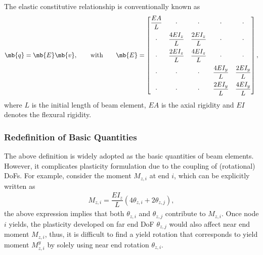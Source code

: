 The elastic constitutive relationship is conventionally known as
\begin{gather*}
\mb{q}=\mb{E}\mb{v},\qquad\text{with}\qquad\mb{E}=\begin{bmatrix}
\dfrac{EA}{L}&\cdot&\cdot&\cdot&\cdot\\[3mm]
\cdot&\dfrac{4EI_z}{L}&\dfrac{2EI_z}{L}&\cdot&\cdot\\[3mm]
\cdot&\dfrac{2EI_z}{L}&\dfrac{4EI_z}{L}&\cdot&\cdot\\[3mm]
\cdot&\cdot&\cdot&\dfrac{4EI_y}{L}&\dfrac{2EI_y}{L}\\[3mm]
\cdot&\cdot&\cdot&\dfrac{2EI_y}{L}&\dfrac{4EI_y}{L}
\end{bmatrix},
\end{gather*}
where $L$ is the initial length of beam element, $EA$ is the axial rigidity and $EI$ denotes the flexural rigidity.
\subsubsection{Redefinition of Basic Quantities}
The above definition is widely adopted as the basic quantities of beam elements. However, it complicates plasticity formulation due to the coupling of (rotational) DoFs. For example, consider the moment $M_{z,i}$ at end $i$, which can be explicitly written as
\begin{gather*}
M_{z,i}=\dfrac{EI_z}{L}\left(4\theta_{z,i}+2\theta_{z,j}\right),
\end{gather*}
the above expression implies that both $\theta_{z,i}$ and $\theta_{z,j}$ contribute to $M_{z,i}$. Once node $i$ yields, the plasticity developed on far end DoF $\theta_{z,j}$ would also affect near end moment $M_{z,i}$, thus, it is difficult to find a yield rotation that corresponds to yield moment $M^y_{z,i}$ by solely using near end rotation $\theta_{z,i}$.

